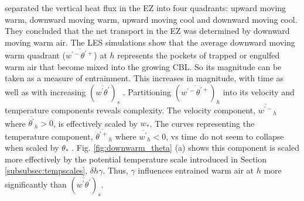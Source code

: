 \documentclass[referee]{svjour3}
\begin{document}
\cite{SullMoengStev} separated the vertical heat flux in the EZ into four quadrants: upward moving warm, downward moving warm, upward moving cool and downward moving cool. They concluded that the net transport in the EZ was determined by downward moving warm air. The LES simulations show that the average downward moving warm quadrant ($\overline{w^{'-}\theta^{'+}}$) at $h$ represents the pockets of trapped or engulfed warm air that become mixed into the growing CBL.  So its magnitude can be taken as a measure of entrainment.  This increases in magnitude, with time as well as with increasing $(\overline{w^{'}\theta^{'}})_{s}$ \citep{NChap14}.  Partitioning $(\overline{w^{'-}\theta^{'+}})_{h}$ into its velocity and temperature components reveals complexity.  The velocity component, $\overline{w^{'-}}_{h}$  where $ \overline{\theta^{'}}_{h}>0$, is effectively scaled by $w_{*}$.  The curves representing the temperature component, $\overline{\theta^{'+}}_{h}$ where $\overline{w^{'}}_{h}<0$, vs time do not seem to collapse when scaled by $\theta_{*}$ \citep{NChap14}.  Fig. \ref{fig:downwarm_theta} (a) shows this component is scaled more effectively by the potential temperature scale introduced in Section \ref{subsubsec:tempscales}, $\delta h \gamma$.  Thus, $\gamma$ influences entrained warm air at $h$ more significantly than $(\overline{w^{'}\theta^{'}})_{s}$.\\ 
\\   
\end{document}
